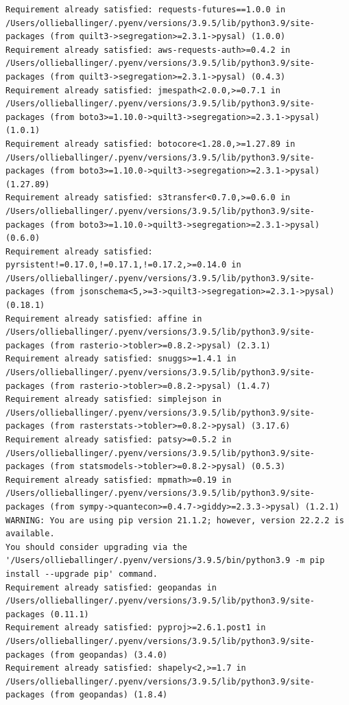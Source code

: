 \documentclass[
  letterpaper,
  DIV=11,
  numbers=noendperiod]{scrreprt}
\begin{document}
\begin{verbatim}
Requirement already satisfied: requests-futures==1.0.0 in /Users/ollieballinger/.pyenv/versions/3.9.5/lib/python3.9/site-packages (from quilt3->segregation>=2.3.1->pysal) (1.0.0)
Requirement already satisfied: aws-requests-auth>=0.4.2 in /Users/ollieballinger/.pyenv/versions/3.9.5/lib/python3.9/site-packages (from quilt3->segregation>=2.3.1->pysal) (0.4.3)
Requirement already satisfied: jmespath<2.0.0,>=0.7.1 in /Users/ollieballinger/.pyenv/versions/3.9.5/lib/python3.9/site-packages (from boto3>=1.10.0->quilt3->segregation>=2.3.1->pysal) (1.0.1)
Requirement already satisfied: botocore<1.28.0,>=1.27.89 in /Users/ollieballinger/.pyenv/versions/3.9.5/lib/python3.9/site-packages (from boto3>=1.10.0->quilt3->segregation>=2.3.1->pysal) (1.27.89)
Requirement already satisfied: s3transfer<0.7.0,>=0.6.0 in /Users/ollieballinger/.pyenv/versions/3.9.5/lib/python3.9/site-packages (from boto3>=1.10.0->quilt3->segregation>=2.3.1->pysal) (0.6.0)
Requirement already satisfied: pyrsistent!=0.17.0,!=0.17.1,!=0.17.2,>=0.14.0 in /Users/ollieballinger/.pyenv/versions/3.9.5/lib/python3.9/site-packages (from jsonschema<5,>=3->quilt3->segregation>=2.3.1->pysal) (0.18.1)
Requirement already satisfied: affine in /Users/ollieballinger/.pyenv/versions/3.9.5/lib/python3.9/site-packages (from rasterio->tobler>=0.8.2->pysal) (2.3.1)
Requirement already satisfied: snuggs>=1.4.1 in /Users/ollieballinger/.pyenv/versions/3.9.5/lib/python3.9/site-packages (from rasterio->tobler>=0.8.2->pysal) (1.4.7)
Requirement already satisfied: simplejson in /Users/ollieballinger/.pyenv/versions/3.9.5/lib/python3.9/site-packages (from rasterstats->tobler>=0.8.2->pysal) (3.17.6)
Requirement already satisfied: patsy>=0.5.2 in /Users/ollieballinger/.pyenv/versions/3.9.5/lib/python3.9/site-packages (from statsmodels->tobler>=0.8.2->pysal) (0.5.3)
Requirement already satisfied: mpmath>=0.19 in /Users/ollieballinger/.pyenv/versions/3.9.5/lib/python3.9/site-packages (from sympy->quantecon>=0.4.7->giddy>=2.3.3->pysal) (1.2.1)
WARNING: You are using pip version 21.1.2; however, version 22.2.2 is available.
You should consider upgrading via the '/Users/ollieballinger/.pyenv/versions/3.9.5/bin/python3.9 -m pip install --upgrade pip' command.
Requirement already satisfied: geopandas in /Users/ollieballinger/.pyenv/versions/3.9.5/lib/python3.9/site-packages (0.11.1)
Requirement already satisfied: pyproj>=2.6.1.post1 in /Users/ollieballinger/.pyenv/versions/3.9.5/lib/python3.9/site-packages (from geopandas) (3.4.0)
Requirement already satisfied: shapely<2,>=1.7 in /Users/ollieballinger/.pyenv/versions/3.9.5/lib/python3.9/site-packages (from geopandas) (1.8.4)

\end{verbatim}
\end{document}
